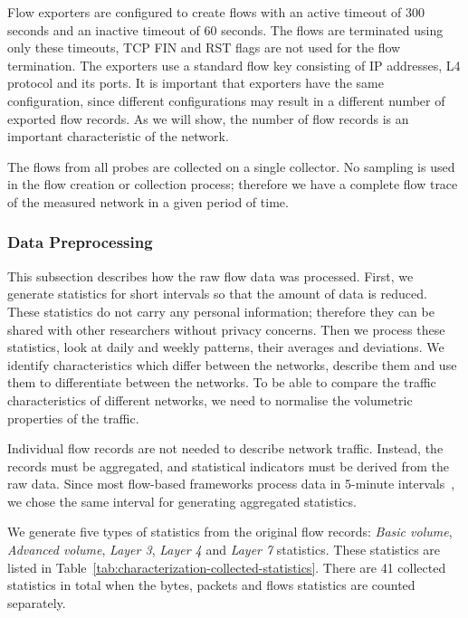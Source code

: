 Flow exporters are configured to create flows with an active timeout of 300 seconds and an inactive timeout of 60 seconds. The flows are terminated using only these timeouts, TCP FIN and RST flags are not used for the flow termination. The exporters use a standard flow key consisting of IP addresses, L4 protocol and its ports. It is important that exporters have the same configuration, since different configurations may result in a different number of exported flow records. As we will show, the number of flow records is an important characteristic of the network.

The flows from all probes are collected on a single collector. No sampling is used in the flow creation or collection process; therefore we have a complete flow trace of the measured network in a given period of time.


\subsubsection{Data Preprocessing}

This subsection describes how the raw flow data was processed. First, we generate statistics for short intervals so that the amount of data is reduced. These statistics do not carry any personal information; therefore they can be shared with other researchers without privacy concerns. Then we process these statistics, look at daily and weekly patterns, their averages and deviations. We identify characteristics which differ between the networks, describe them and use them to differentiate between the networks. To be able to compare the traffic characteristics of different networks, we need to normalise the volumetric properties of the traffic.

Individual flow records are not needed to describe network traffic. Instead, the records must be aggregated, and statistical indicators must be derived from the raw data. Since most flow-based frameworks process data in 5-minute intervals~\cite{Haag-2011-NfSen}, we chose the same interval for generating aggregated statistics.

We generate five types of statistics from the original flow records: \emph{Basic volume}, \emph{Advanced volume}, \emph{Layer 3}, \emph{Layer 4} and \emph{Layer 7} statistics. These statistics are listed in Table~\ref{tab:characterization-collected-statistics}. There are 41 collected statistics in total when the bytes, packets and flows statistics are counted separately. 

